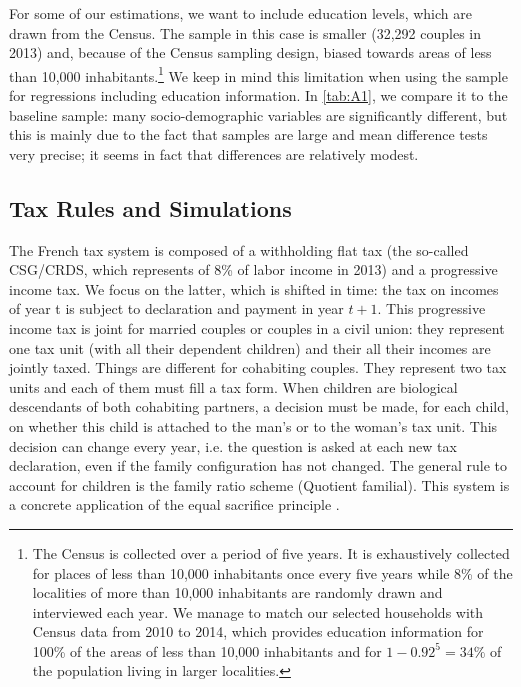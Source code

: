 For some of our estimations, we want to include education levels, which are drawn from the Census. The sample in this case is smaller (32,292 couples in 2013) and, because of the Census sampling design, biased towards areas of less than 10,000 inhabitants.\footnote{The Census is collected over a period of five years. It is exhaustively collected for places of less than 10,000 inhabitants once every five years while 8\% of the localities of more than 10,000 inhabitants are randomly drawn and interviewed each year. We manage to match our selected households with Census data from 2010 to 2014, which provides education information for 100\% of the areas of less than 10,000 inhabitants and for $1-0.92^5 = 34\%$ of the population living in larger localities.}
We keep in mind this limitation when using the sample for regressions including education information. In \autoref{tab:A1},
 we compare it to the baseline sample: many socio-demographic variables are significantly different, but this is mainly due to the fact that samples are large and mean difference tests very precise; it seems in fact that differences are relatively modest. 

\subsection{Tax Rules and Simulations}
The French tax system is composed of a withholding flat tax (the so-called CSG/CRDS, which represents of 8\% of labor income in 2013) and a progressive income tax. We focus on the latter, which is shifted in time: the tax on incomes of year t is subject to declaration and payment in year $t+1$. This progressive income tax is joint for married couples or couples in a civil union: they represent one tax unit (with all their dependent children) and their all their incomes are jointly taxed. Things are different for cohabiting couples. They represent two tax units and each of them must fill a tax form. When children are biological descendants of both cohabiting partners, a decision must be made, for each child, on whether this child is attached to the man’s or to the woman’s tax unit.  This decision can change every year, i.e. the question is asked at each new tax declaration, even if the family configuration has not changed. The general rule to account for children is the family ratio scheme (Quotient familial). This system is a concrete application of the equal sacrifice principle \citep{young1987progressive}.

